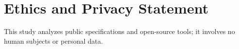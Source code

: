 \documentclass[sigconf, review, anonymous]{acmart}
\begin{document}
\section*{Ethics and Privacy Statement}
This study analyzes public specifications and open-source tools; it involves no human subjects or personal data.




\appendix

\end{document}
